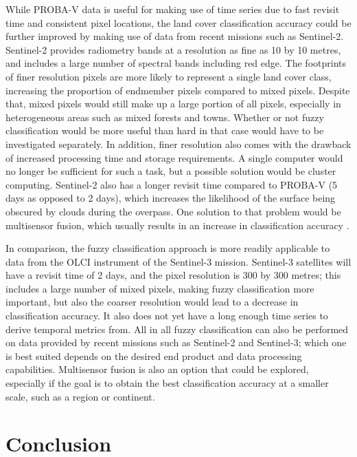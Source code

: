 \documentclass[a4paper,12pt]{scrbook}
\begin{document}
While PROBA-V data is useful for making use of time series due to fast revisit time and consistent pixel locations, the land cover classification accuracy could be further improved by making use of data from recent missions such as Sentinel-2. Sentinel-2 provides radiometry bands at a resolution as fine as 10 by 10 metres, and includes a large number of spectral bands including red edge. The footprints of finer resolution pixels are more likely to represent a single land cover class, increasing the proportion of endmember pixels compared to mixed pixels. Despite that, mixed pixels would still make up a large portion of all pixels, especially in heterogeneous areas such as mixed forests and towns. Whether or not fuzzy classification would be more useful than hard in that case would have to be investigated separately. In addition, finer resolution also comes with the drawback of increased processing time and storage requirements. A single computer would no longer be sufficient for such a task, but a possible solution would be cluster computing. Sentinel-2 also has a longer revisit time compared to PROBA-V (5 days as opposed to 2 days), which increases the likelihood of the surface being obscured by clouds during the overpass. One solution to that problem would be multisensor fusion, which usually results in an increase in classification accuracy \citep{yu2014metadiscoveries}.

In comparison, the fuzzy classification approach is more readily applicable to data from the OLCI instrument of the Sentinel-3 mission. Sentinel-3 satellites will have a revisit time of 2 days, and the pixel resolution is 300 by 300 metres; this includes a large number of mixed pixels, making fuzzy classification more important, but also the coarser resolution would lead to a decrease in classification accuracy. It also does not yet have a long enough time series to derive temporal metrics from. All in all fuzzy classification can also be performed on data provided by recent missions such as Sentinel-2 and Sentinel-3; which one is best suited depends on the desired end product and data processing capabilities. Multisensor fusion is also an option that could be explored, especially if the goal is to obtain the best classification accuracy at a smaller scale, such as a region or continent.

\chapter{Conclusion}
\end{document}

